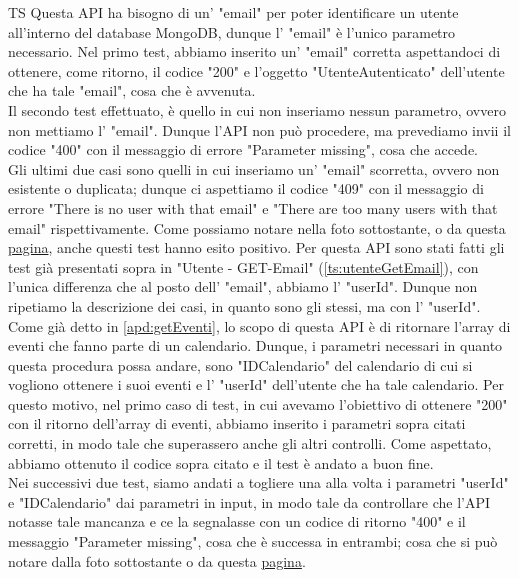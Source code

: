 \begin{listaPersonale}{TS}
                Questa API ha bisogno di un' "email" per poter identificare un utente all'interno del database MongoDB, dunque l' "email" è l'unico parametro necessario. Nel primo test, abbiamo inserito un' "email" corretta aspettandoci di ottenere, come ritorno, il codice "200" e l'oggetto "UtenteAutenticato" dell'utente che ha tale "email", cosa che è avvenuta.
                 \\
                Il secondo test effettuato, è quello in cui non inseriamo nessun parametro, ovvero non mettiamo l' "email". Dunque l'API non può procedere, ma prevediamo invii il codice "400" con il messaggio di errore "Parameter missing", cosa che accede.
                 \\
                Gli ultimi due casi sono quelli in cui inseriamo un' "email" scorretta, ovvero non esistente o duplicata; dunque ci aspettiamo il codice "409" con il messaggio di errore "There is no user with that email" e "There are too many users with that email" rispettivamente. Come possiamo notare nella foto sottostante, o da questa \href{https://plan-it.it/test-report.html} {pagina}, anche questi test hanno esito positivo.
                Per questa API sono stati fatti gli test già presentati sopra in "Utente - GET-Email" (\ref{ts:utenteGetEmail}), con l'unica differenza che al posto dell' "email", abbiamo l' "userId". Dunque non ripetiamo la descrizione dei casi, in quanto sono gli stessi, ma con l' "userId".
                Come già detto in \ref{apd:getEventi}, lo scopo di questa API è di ritornare l'array di eventi che fanno parte di un calendario. Dunque, i parametri necessari in quanto questa procedura possa andare, sono "IDCalendario" del calendario di cui si vogliono ottenere i suoi eventi e l' "userId" dell'utente che ha tale calendario. Per questo motivo, nel primo caso di test, in cui avevamo l'obiettivo di ottenere "200" con il ritorno dell'array di eventi, abbiamo inserito i parametri sopra citati corretti, in modo tale che superassero anche gli altri controlli. Come aspettato, abbiamo ottenuto il codice sopra citato e il test è andato a buon fine.
                 \\
                Nei successivi due test, siamo andati a togliere una alla volta i parametri "userId" e "IDCalendario" dai parametri in input, in modo tale da controllare che l'API notasse tale mancanza e ce la segnalasse con un codice di ritorno "400" e il messaggio "Parameter missing", cosa che è successa in entrambi; cosa che si può notare dalla foto sottostante o da questa \href{https://plan-it.it/test-report.html} {pagina}.

\end{listaPersonale}
